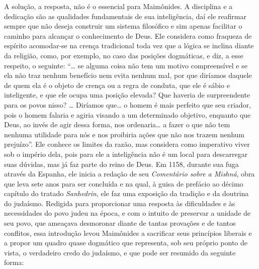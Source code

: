 A solução, a resposta, não é o essencial para Maimônides. A disciplina e
a dedicação são as qualidades fundamentais de sua inteligência, daí ele
reafirmar sempre que não deseja construir um sistema filosófico e sim
apenas facilitar o caminho para alcançar o conhecimento de Deus. Ele
considera como fraqueza de espírito acomodar-se na crença tradicional toda vez que a
lógica se inclina diante da religião, como, por exemplo, no caso das posições
dogmáticas, e diz, a esse respeito, o seguinte: ``\ldots{} se alguma coisa
não tem um motivo compreensível e se ela não traz nenhum benefício nem evita nenhum mal,
por que diríamos daquele de quem ela é o objeto de crença ou a regra de
conduta, que ele é sábio e inteligente, e que ele ocupa uma posição elevada? Que
haveria de surpreendente para os povos nisso? \ldots{} Diríamos que\ldots{} o homem é
mais perfeito que seu criador, pois o homem falaria e agiria visando a
um determinado objetivo, enquanto que Deus, ao invés de agir dessa forma, nos ordenaria\ldots{} a fazer o que não tem nenhuma utilidade para nós e nos proibiria ações
que não nos trazem nenhum prejuízo''. Ele conhece os limites da razão, mas
considera como imperativo viver sob o império dela, pois para ele a
inteligência não é um local para descarregar suas dúvidas, mas já faz parte do reino de
Deus. Em 1158, durante sua fuga através da Espanha, ele inicia a redação
de seu \emph{Comentário sobre a Mishná}, obra que leva sete anos para
ser concluída e na qual, à guisa de prefácio ao décimo capítulo do
tratado \emph{Sanhedrin}, ele faz uma exposição da tradição e da
doutrina do judaísmo. Redigida para proporcionar uma resposta às
dificuldades e às necessidades do povo judeu na época, e com o intuito
de preservar a unidade de seu povo, que ameaçava desmoronar diante de
tantas provações e de tantos conflitos, essa introdução levou Maimônides
a sacrificar seus princípios liberais e a propor um quadro quase
dogmático que representa, sob seu próprio ponto de vista, o verdadeiro
credo do judaísmo, e que pode ser resumido da seguinte forma:


